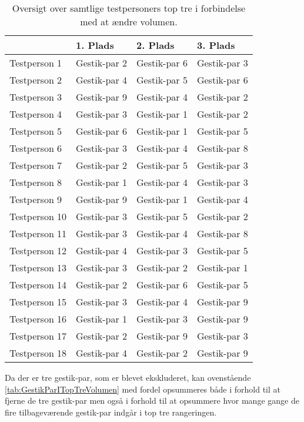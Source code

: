 \begin{table}[H]
	\centering
	\begin{tabular}{ | p{3cm} | p{3cm} | p{3cm} | p{3cm} |}
		\hline
		& 1. Plads & 2. Plads & 3. Plads \\ \hline
		Testperson 1 & Gestik-par 2 & Gestik-par 6 & Gestik-par 3 \\ \hline
		Testperson 2 & Gestik-par 4 & Gestik-par 5 & Gestik-par 6 \\ \hline
		Testperson 3 & Gestik-par 9 & Gestik-par 4 & Gestik-par 2 \\ \hline
		Testperson 4 & Gestik-par 3 & Gestik-par 1 & Gestik-par 2 \\ \hline
		Testperson 5 & Gestik-par 6 & Gestik-par 1 & Gestik-par 5 \\ \hline
		Testperson 6 & Gestik-par 3 & Gestik-par 4 & Gestik-par 8 \\ \hline 
		Testperson 7 & Gestik-par 2 & Gestik-par 5 & Gestik-par 3 \\ \hline
		Testperson 8 & Gestik-par 1 & Gestik-par 4 & Gestik-par 3 \\ \hline
		Testperson 9 & Gestik-par 9 & Gestik-par 1 & Gestik-par 4 \\ \hline
		Testperson 10 & Gestik-par 3 & Gestik-par 5 & Gestik-par 2 \\ \hline
		Testperson 11 & Gestik-par 3 & Gestik-par 4 & Gestik-par 8 \\ \hline
		Testperson 12 & Gestik-par 4 & Gestik-par 3 & Gestik-par 5 \\ \hline
		Testperson 13 & Gestik-par 3 & Gestik-par 2 & Gestik-par 1 \\ \hline
		Testperson 14 & Gestik-par 2 & Gestik-par 6 & Gestik-par 5 \\ \hline
		Testperson 15 & Gestik-par 3 & Gestik-par 4 & Gestik-par 9 \\ \hline
		Testperson 16 & Gestik-par 1 & Gestik-par 3 & Gestik-par 9 \\ \hline
		Testperson 17 & Gestik-par 2 & Gestik-par 9 & Gestik-par 3 \\ \hline
		Testperson 18 & Gestik-par 4 & Gestik-par 2 & Gestik-par 9 \\ \hline
	\end{tabular}
	\caption{Oversigt over samtlige testpersoners top tre i forbindelse med at ændre volumen.}
	\label{tab:GestikParITopTreVolumen}
\end{table}
\noindent
%
Da der er tre gestik-par, som er blevet ekskluderet, kan ovenstående  \autoref{tab:GestikParITopTreVolumen} med fordel opsummeres både i forhold til at fjerne de tre gestik-par men også i forhold til at opsummere hvor mange gange de fire tilbageværende gestik-par indgår i top tre rangeringen. 

